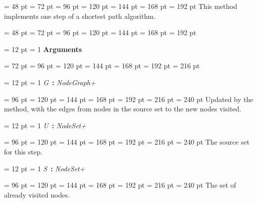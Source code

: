 {{{{\par \noindent  \leftskip = 48 pt  \leftmargini = 72 pt  \leftmarginii = 96 pt  \leftmarginiii = 120 pt  \leftmarginiv = 144 pt  \leftmarginv = 168 pt  \leftmarginvi = 192 pt  This method implements one step of a shortest path algorithm.
\par}
{\par \noindent  \leftskip = 48 pt  \leftmargini = 72 pt  \leftmarginii = 96 pt  \leftmarginiii = 120 pt  \leftmarginiv = 144 pt  \leftmarginv = 168 pt  \leftmarginvi = 192 pt {\par \noindent
{\par \pagebreak[3.100000] \noindent \hangindent = 12 pt \hangafter = 1 
{\bf Arguments\/}\par}
{\par \noindent  \leftskip = 72 pt  \leftmargini = 96 pt  \leftmarginii = 120 pt  \leftmarginiii = 144 pt  \leftmarginiv = 168 pt  \leftmarginv = 192 pt  \leftmarginvi = 216 pt {\par \noindent
{\par \pagebreak[3.000000] \noindent \hangindent = 12 pt \hangafter = 1 
{\em G\/}~{\bf :}  {\em NodeGraph+\/}\par}
{\par \noindent  \leftskip = 96 pt  \leftmargini = 120 pt  \leftmarginii = 144 pt  \leftmarginiii = 168 pt  \leftmarginiv = 192 pt  \leftmarginv = 216 pt  \leftmarginvi = 240 pt          Updated by the method, with the edges from nodes in the
                source set to the new nodes visited.
\par}
{\par \pagebreak[3.000000] \noindent \hangindent = 12 pt \hangafter = 1 
{\em U\/}~{\bf :}  {\em NodeSet+\/}\par}
{\par \noindent  \leftskip = 96 pt  \leftmargini = 120 pt  \leftmarginii = 144 pt  \leftmarginiii = 168 pt  \leftmarginiv = 192 pt  \leftmarginv = 216 pt  \leftmarginvi = 240 pt  The source set for this step.
\par}
{\par \pagebreak[3.000000] \noindent \hangindent = 12 pt \hangafter = 1 
{\em S\/}~{\bf :}  {\em NodeSet+\/}\par}
{\par \noindent  \leftskip = 96 pt  \leftmargini = 120 pt  \leftmarginii = 144 pt  \leftmarginiii = 168 pt  \leftmarginiv = 192 pt  \leftmarginv = 216 pt  \leftmarginvi = 240 pt  The set of already visited nodes.
\par}
}}}}}}}
